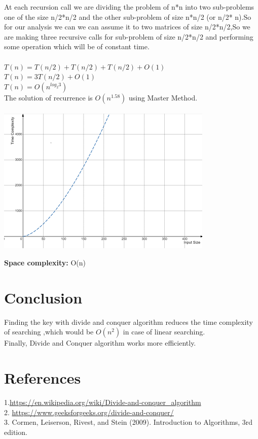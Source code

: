 \documentclass[conference]{IEEEtran}
\begin{document}
At each recursion call we are dividing the problem of n*n into two sub-problems one of the size n/2*n/2 and the other sub-problem of size n*n/2 (or n/2* n).So for our analysis we can we can assume it to two matrices of size n/2*n/2,So we are making three recursive calls for sub-problem of size n/2*n/2 and performing some operation which will be of constant time.\\\\

$T(n) = T(n/2) + T(n/2) + T(n/2) + O(1)$ \\
$T(n) = 3T(n/2) + O(1)$ \\
$T(n) = O(n^{log_{2}3})$ \\
 

The solution of recurrence is $O(n^{1.58})$ using Master Method.\\
\\
\includegraphics{Screenshot (257)}

\textbf{Space complexity:} O(n) \\


\section{Conclusion}
Finding the key with divide and conquer algorithm reduces the time complexity of searching ,which would be $O(n^{2})$ in case of linear searching.\\
Finally, Divide and Conquer algorithm works more efficiently.

 \section{References}
\color{blue}1.{\url{https://en.wikipedia.org/wiki/Divide-and-conquer_algorithm} }\\
2. {\url{https://www.geeksforgeeks.org/divide-and-conquer/}}\\
3. Cormen, Leiserson, Rivest, and Stein (2009). Introduction to Algorithms, 3rd edition.
\end{document}
